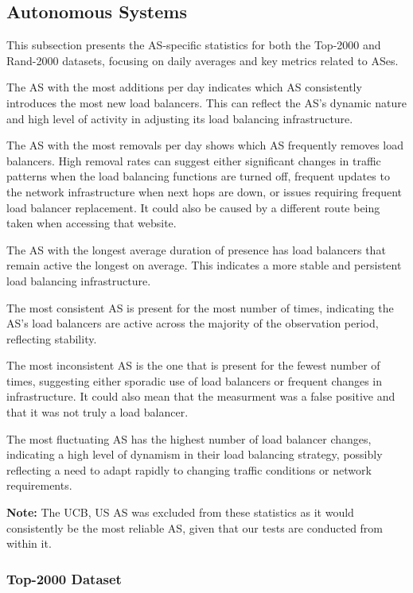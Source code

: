 \documentclass[12pt]{cwru_thesis}
\begin{document}
\subsection{Autonomous Systems}

This subsection presents the AS-specific statistics for both the Top-2000 and Rand-2000 datasets, focusing on daily averages and key metrics related to ASes.

The AS with the most additions per day indicates which AS consistently introduces the most new load balancers. This can reflect the AS's dynamic nature and high level of activity in adjusting its load balancing infrastructure.

The AS with the most removals per day shows which AS frequently removes load balancers. High removal rates can suggest either significant changes in traffic patterns when the load balancing functions are turned off, frequent updates to the network infrastructure when next hops are down, or issues requiring frequent load balancer replacement. It could also be caused by a different route being taken when accessing that website. 

The AS with the longest average duration of presence has load balancers that remain active the longest on average. This indicates a more stable and persistent load balancing infrastructure.

The most consistent AS is present for the most number of times, indicating the AS's load balancers are active across the majority of the observation period, reflecting stability.

The most inconsistent AS is the one that is present for the fewest number of times, suggesting either sporadic use of load balancers or frequent changes in infrastructure. It could also mean that the measurment was a false positive and that it was not truly a load balancer.

The most fluctuating AS has the highest number of load balancer changes, indicating a high level of dynamism in their load balancing strategy, possibly reflecting a need to adapt rapidly to changing traffic conditions or network requirements.

\textbf{Note:} The UCB, US AS was excluded from these statistics as it would consistently be the most reliable AS, given that our tests are conducted from within it.


\subsubsection{Top-2000 Dataset}
\end{document}
